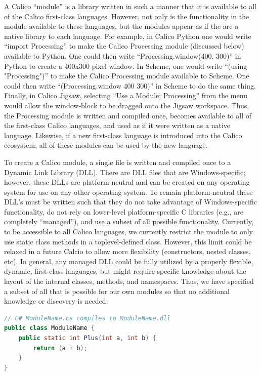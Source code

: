\documentclass[preprint]{sigplanconf}
\begin{document}
A Calico ``module'' is a library written in such a manner that it is
available to all of the Calico first-class languages. However, not
only is the functionality in the module available to these languages,
but the modules appear as if the are a native library to each
language. For example, in Calico Python one would write ``import
Processing'' to make the Calico Processing module (discussed below)
available to Python. One could then write ``Processing.window(400,
300)'' in Python to create a 400x300 pixel window. In Scheme, one
would write ``(using "Processing")'' to make the Calico Processing
module available to Scheme. One could then write ``(Processing.window
400 300)'' in Scheme to do the same thing. Finally, in Calico Jigsaw,
selecting ``Use a Module; Processing'' from the menu would allow the
window-block to be dragged onto the Jigsaw workspace. Thus, the
Processing module is written and compiled once, becomes available to
all of the first-class Calico languages, and used as if it were
written as a native language. Likewise, if a new first-class language
is introduced into the Calico ecosystem, all of these modules can be
used by the new language.

To create a Calico module, a single file is written and compiled once
to a Dynamic Link Library (DLL). There are DLL files that are
Windows-specific; however, these DLLs are platform-neutral and can be
created on any operating system for use on any other operating
system. To remain platform-neutral these DLL's must be written such
that they do not take advantage of Windows-specific functionality, do
not rely on lower-level platform-specific C libraries (e.g., are
completely ``managed''), and use a subset of all possible
functionality. Currently, to be accessible to all Calico languages, we
currently restrict the module to only use static class methods in a
toplevel-defined class. However, this limit could be relaxed in a
future Calcio to allow more flexibility (constructors, nested classes,
etc). In general, any managed DLL could be fully utilized by a
properly flexible, dynamic, first-class languages, but might require
specific knowledge about the layout of the internal classes, methods,
and namespaces. Thus, we have specified a subset of all that is
possible for our own modules so that no additional knowledge or
discovery is needed.

\begin{lstlisting}[language=Java, caption={Example module template.}, label={csharp-module}]
// C# ModuleName.cs compiles to ModuleName.dll
public class ModuleName {
    public static int Plus(int a, int b) {
        return (a + b);
    }
}
\end{lstlisting}
\end{document}
